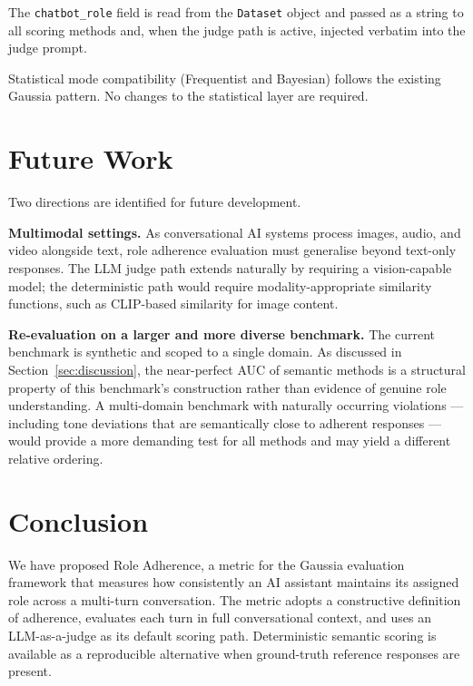 \documentclass[11pt,a4paper]{article}
\begin{document}
The \texttt{chatbot\_role} field is read from the \texttt{Dataset} object
and passed as a string to all scoring methods and, when the judge path is
active, injected verbatim into the judge prompt.

Statistical mode compatibility (Frequentist and Bayesian) follows the existing
Gaussia pattern. No changes to the statistical layer are required.



\section{Future Work}

Two directions are identified for future development.

\textbf{Multimodal settings.} As conversational AI systems process images,
audio, and video alongside text, role adherence evaluation must generalise
beyond text-only responses. The LLM judge path extends naturally by
requiring a vision-capable model; the deterministic path would require
modality-appropriate similarity functions, such as CLIP-based similarity
\citep{radford2021clip} for image content.

\textbf{Re-evaluation on a larger and more diverse benchmark.} The current
benchmark is synthetic and scoped to a single domain. As discussed in
Section~\ref{sec:discussion}, the near-perfect AUC of semantic methods is
a structural property of this benchmark's construction rather than evidence
of genuine role understanding. A multi-domain benchmark with naturally
occurring violations --- including tone deviations that are semantically
close to adherent responses --- would provide a more demanding test for
all methods and may yield a different relative ordering.

\section{Conclusion}

We have proposed Role Adherence, a metric for the Gaussia evaluation framework
that measures how consistently an AI assistant maintains its assigned role
across a multi-turn conversation. The metric adopts a constructive definition of adherence, evaluates each
turn in full conversational context, and uses an LLM-as-a-judge as its
default scoring path. Deterministic semantic scoring is available as a
reproducible alternative when ground-truth reference responses are present.
\end{document}
